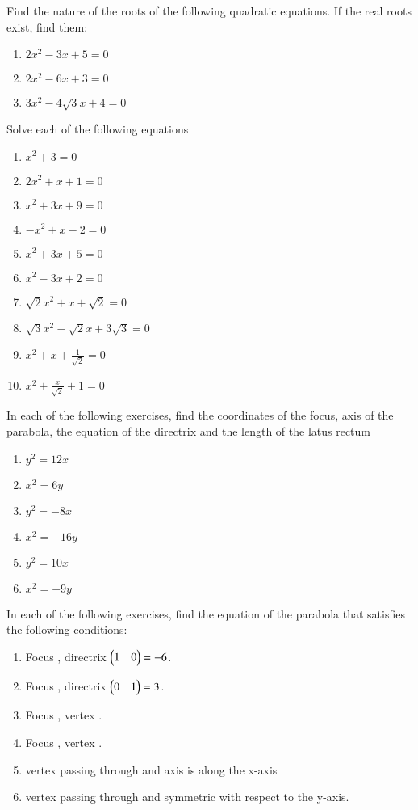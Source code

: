 
\item Find the nature of the roots of the following quadratic equations. If the real roots exist, find them:
\begin{enumerate}
\item 	$2x^2-3x+5 = 0$
\item 	$2x^2-6x+3 = 0$
\item 	$3x^2-4\sqrt{3}x+4 = 0$
\end{enumerate}
\item Solve each of the following equations
%
\begin{enumerate}
\item 	$x^2+3 = 0$
\item 	$2x^2+x+1 = 0$
\item 	$x^2+3x+9 = 0$
\item 	$-x^2+x-2 = 0$
\item 	$x^2+3x+5 = 0$
\item 	$x^2-3x+2 = 0$
\item 	$\sqrt{2}x^2+x+\sqrt{2} = 0$
\item 	$\sqrt{3}x^2-\sqrt{2}x+3\sqrt{3} = 0$
\item 	$x^2+x+\frac{1}{\sqrt{2}} = 0$
\item 	$x^2+\frac{x}{\sqrt{2}}+1 = 0$
\end{enumerate}
%
\item In each of the following exercises, find the coordinates of the focus, axis of the parabola, the equation of the directrix and the length of the latus rectum
\begin{enumerate}
\item $y^2 = 12x$
\item $x^2 = 6y$
\item $y^2 = -8x$
\item $x^2 = -16y$
\item $y^2 = 10x$
\item $x^2 = -9y$
\end{enumerate}
%
\item In each of the following exercises, find the equation of the parabola that satisfies the following conditions:
\begin{enumerate}
\item Focus , directrix $\begin{pmatrix}1 & 0\end{pmatrix} = -6$.
\item Focus , directrix $\begin{pmatrix}0 & 1\end{pmatrix} = 3$.
\item Focus , vertex .
\item Focus , vertex .
\item vertex  passing through  and axis is along the x-axis
\item vertex  passing through  and symmetric with respect to the y-axis.
\end{enumerate}
